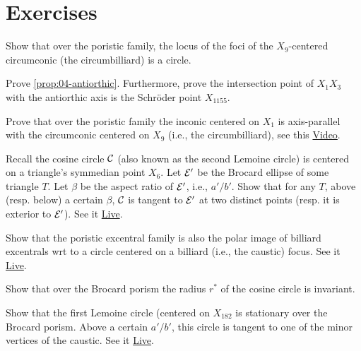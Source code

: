 \section{Exercises}

\begin{exercise}
Show that over the poristic family, the locus of the foci of the $X_9$-centered circumconic (the circumbilliard) is a circle.
\end{exercise}

\begin{exercise}
Prove \cref{prop:04-antiorthic}. Furthermore, prove the intersection point of $X_1 X_3$ with the antiorthic axis is the Schröder point $X_{1155}$.
\end{exercise}

\begin{exercise}
Prove that over the poristic family the inconic centered on $X_1$ is axis-parallel with the circumconic centered on $X_9$ (i.e., the circumbilliard), see this \href{https://youtu.be/0VHBjdHXbJc}{Video}.
\end{exercise}


\begin{exercise}
Recall the cosine circle $\mathcal{C}$ (also known as the second Lemoine circle) is centered on a triangle's symmedian point $X_6$. Let $\mathcal{E}'$ be the Brocard ellipse of some triangle $T$. Let $\beta$ be the aspect ratio of $\mathcal{E}'$, i.e., $a'/b'$. Show that for any $T$, above (resp. below) a certain $\beta$, $\mathcal{C}$ is tangent to $\mathcal{E}'$ at two distinct points (resp. it is exterior to $\mathcal{E}'$). See it \href{https://bit.ly/2RqhUQV}{Live}.
\end{exercise}


\begin{exercise}
Show that the poristic excentral family is also the polar image of billiard excentrals wrt to a circle centered on a billiard (i.e., the caustic) focus. See it \href{https://bit.ly/33c1s9A}{Live}.
\end{exercise}

\begin{exercise}
Show that over the Brocard porism the radius $r^*$ of the cosine circle is invariant.
\end{exercise}

\begin{exercise}
Show that the first Lemoine circle (centered on $X_{182}$ is stationary over the Brocard porism. Above a certain $a'/b'$, this circle is tangent to one of the minor vertices of the caustic. See it \href{https://bit.ly/3tp0XUq}{Live}.
\end{exercise}

